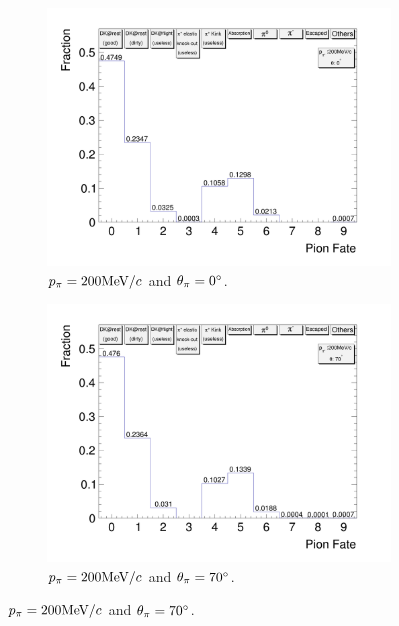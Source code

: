           \begin{figure}[ht]
               \centering
               \begin{subfigure}{\dbfigwid\textwidth}
                    \includegraphics[width=\textwidth]{figures/sel/pion_fate_200_0.png}
                    \caption{$p_{\pi}=200\textrm{MeV}/c$ and $\theta_{\pi}=0^\circ$.}
                    \label{subfig:pi-fate-200-0}
               \end{subfigure}
               \begin{subfigure}{\dbfigwid\textwidth}
                    \includegraphics[width=\textwidth]{figures/sel/pion_fate_200_70.png}
                    \caption{$p_{\pi}=200\textrm{MeV}/c$ and $\theta_{\pi}=70^\circ$.}
                    \label{subfig:pi-fate-200-70}

\end{subfigure}
\end{figure}
